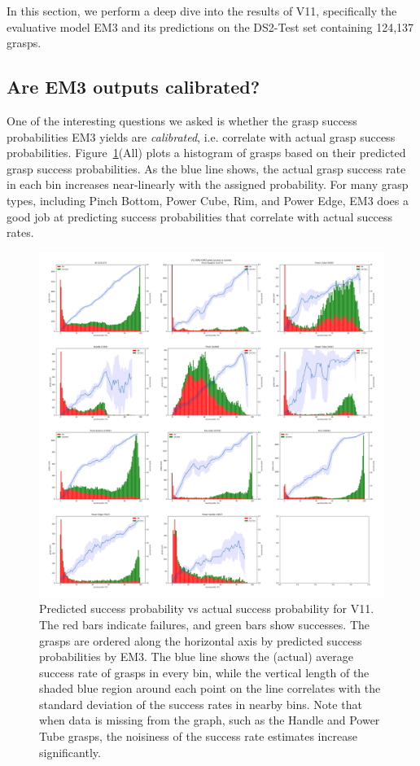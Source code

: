 
\noindent
In this section, we perform a deep dive into the results of V11, specifically the evaluative model EM3 and its predictions on the DS2-Test set containing 124,137 grasps. 

\subsection{Are EM3 outputs calibrated?}
\noindent

One of the interesting questions we asked is whether the grasp success probabilities EM3 yields are \textit{calibrated}, i.e. correlate with actual grasp success probabilities. Figure~\ref{fig:calibrate}(All) plots a histogram of grasps based on their predicted grasp success probabilities. As the blue line shows, the actual grasp success rate in each bin increases near-linearly with the assigned probability. For many grasp types, including Pinch Bottom, Power Cube, Rim, and Power Edge, EM3 does a good job at predicting success probabilities that correlate with actual success rates. 

\begin{figure}
\centering
\includegraphics[width=0.8\columnwidth]{images/post-analysis/V11_pred_success_vs_success.png}
\caption{Predicted success probability vs actual success probability for V11. The red bars indicate failures, and green bars show successes. The grasps are ordered along the horizontal axis by predicted success probabilities by EM3. The blue line shows the (actual) average success rate of grasps in every bin, while the vertical length of the shaded blue region around each point on the line correlates with the standard deviation of the success rates in nearby bins. Note that when data is missing from the graph, such as the Handle and Power Tube grasps, the noisiness of the success rate estimates increase significantly.}
\label{fig:calibrate}
\end{figure}



